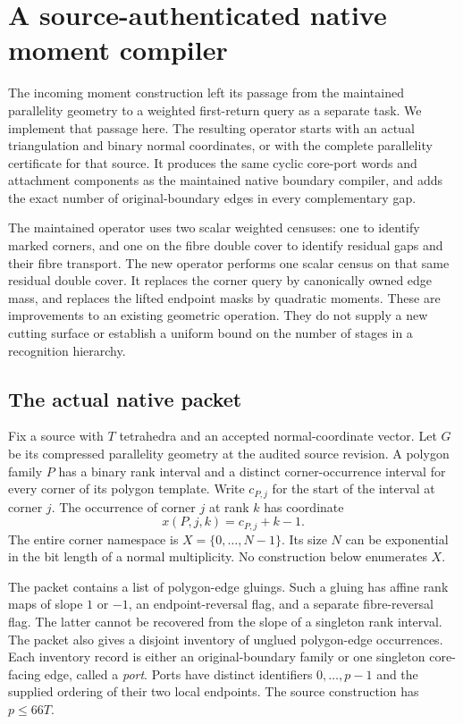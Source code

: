 \section{A source-authenticated native moment compiler}
\label{sec:native-moments}

The incoming moment construction left its passage from the maintained
parallelity geometry to a weighted first-return query as a separate task.
We implement that passage here.  The resulting operator starts with an
actual triangulation and binary normal coordinates, or with the complete
parallelity certificate for that source.  It produces the same cyclic
core-port words and attachment components as the maintained native boundary
compiler, and adds the exact number of original-boundary edges in every
complementary gap.

The maintained operator uses two scalar weighted censuses: one to identify
marked corners, and one on the fibre double cover to identify residual
gaps and their fibre transport.  The new operator performs one scalar
census on that same residual double cover.  It replaces the corner query
by canonically owned edge mass, and replaces the lifted endpoint masks by
quadratic moments.  These are improvements to an existing geometric
operation.  They do not supply a new cutting surface or establish a
uniform bound on the number of stages in a recognition hierarchy.

\subsection{The actual native packet}

Fix a source with $T$ tetrahedra and an accepted normal-coordinate vector.
Let $G$ be its compressed parallelity geometry at the audited source
revision.  A polygon family $P$ has a binary rank interval and a distinct
corner-occurrence interval for every corner of its polygon template.
Write $c_{P,j}$ for the start of the interval at corner $j$.  The occurrence
of corner $j$ at rank $k$ has coordinate
\[
                 x(P,j,k)=c_{P,j}+k-1.
\]
The entire corner namespace is $X=\{0,\ldots,N-1\}$.  Its size $N$ can be
exponential in the bit length of a normal multiplicity.  No construction
below enumerates $X$.

The packet contains a list of polygon-edge gluings.  Such a gluing has
affine rank maps of slope $1$ or $-1$, an endpoint-reversal flag, and a
separate fibre-reversal flag.  The latter cannot be recovered from the
slope of a singleton rank interval.  The packet also gives a disjoint
inventory of unglued polygon-edge occurrences.  Each inventory record is
either an original-boundary family or one singleton core-facing edge,
called a \emph{port}.  Ports have distinct identifiers $0,\ldots,p-1$ and
the supplied ordering of their two local endpoints.  The source construction
has $p\leq66T$.

